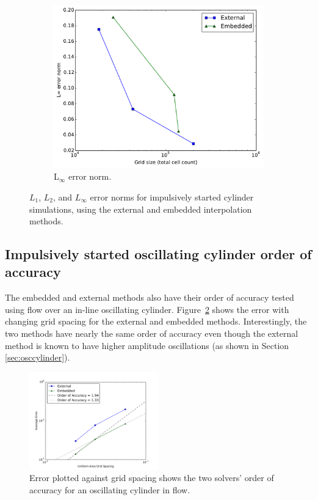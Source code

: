 \documentclass[preprint,12pt]{elsarticle}
\begin{document}
\begin{figure}[htbp]
    \begin{subfigure}{0.5\textwidth}
        \includegraphics[width=\linewidth]{Linf_error_norm}
        \caption{L$_\infty$ error norm.}
    \end{subfigure}
    \caption{$L_1$, $L_2$, and $L_\infty$ error norms for impulsively started cylinder simulations,
    using the external and embedded interpolation methods.
    }
    \label{fig:error norm}
\end{figure}

\subsection{Impulsively started oscillating cylinder order of accuracy}

The embedded and external methods also have their order of accuracy tested using flow over an in-line oscillating cylinder.
Figure~\ref{fig:oscerror} shows the error with changing grid spacing for the external and embedded methods.
Interestingly, the two methods have nearly the same order of accuracy even though the external method is known to have higher amplitude oscillations (as shown in Section \ref{sec:osccylinder}).

\begin{figure}[!htb]
	\centering
	\includegraphics[width=0.5\textwidth]{error_oscflow}
	\caption{Error plotted against grid spacing shows the two solvers' order of accuracy for an oscillating cylinder in flow.}
	\label{fig:oscerror}
\end{figure}
\end{document}
